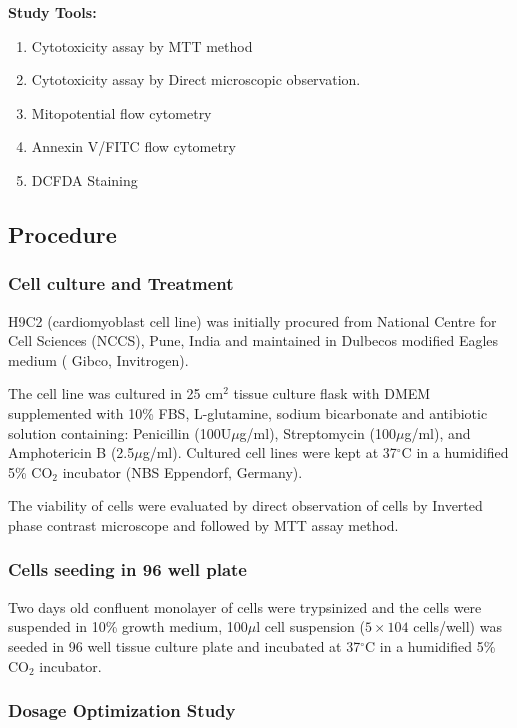 \documentclass[11pt]{article} %
\begin{document}
\textbf{Study Tools:}

\begin{enumerate}
	\item Cytotoxicity assay by MTT method
	\item Cytotoxicity assay by Direct microscopic observation.
	\item Mitopotential flow cytometry
	\item Annexin V/FITC flow cytometry
	\item DCFDA Staining
\end{enumerate}

\subsection{Procedure}
\label{subsec:Procedure}

\subsubsection{Cell culture and Treatment}
\label{subsubsec:Cell culture and Treatment}

H9C2 (cardiomyoblast cell line) was initially procured from National Centre for Cell Sciences (NCCS), Pune, India and maintained in Dulbecos modified Eagles medium ( Gibco, Invitrogen).

The  cell line was  cultured in 25 cm$^2 $ tissue culture flask with DMEM supplemented with 10\% FBS, L-glutamine, sodium bicarbonate and antibiotic solution containing: Penicillin (100U$\mu$g/ml), Streptomycin (100$\mu$g/ml), and Amphotericin B (2.5$\mu$g/ml). Cultured cell lines were kept at 37$^{\circ}$C in a humidified 5\% CO$_2$ incubator (NBS Eppendorf, Germany). 

The viability of cells were evaluated by direct observation of cells by Inverted phase contrast microscope and followed by MTT assay method.

\subsubsection{Cells seeding in 96 well plate}
\label{subsubsec:Cells seeding in 96 well plate}

Two days old confluent monolayer of cells were trypsinized and the cells were suspended in 10\% growth medium, 100$\mu$l cell suspension ($ 5\times104 $ cells/well) was seeded in 96 well tissue culture plate and incubated at 37$^{\circ}$C in a humidified 5\% CO$_2$ incubator. 

\subsubsection{Dosage Optimization Study}
\label{subsub:Dosage Optimization Study}
\end{document}
